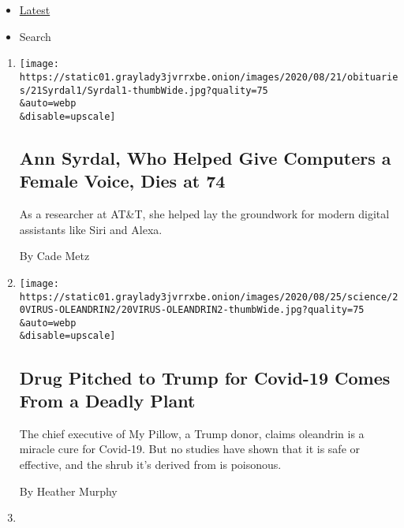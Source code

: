 \begin{itemize}
\tightlist
\item
  \protect\hyperlink{stream-panel}{Latest}
\item
  Search
\end{itemize}

\begin{enumerate}
\def\labelenumi{\arabic{enumi}.}
\item
  \href{/2020/08/20/technology/ann-syrdal-who-helped-give-computers-a-female-voice-dies-at-74.html}{}

  \texttt{[image: https://static01.graylady3jvrrxbe.onion/images/2020/08/21/obituaries/21Syrdal1/Syrdal1-thumbWide.jpg?quality=75\\\&auto=webp\\\&disable=upscale]}

  \hypertarget{ann-syrdal-who-helped-give-computers-a-female-voice-dies-at-74}{%
  \subsection{Ann Syrdal, Who Helped Give Computers a Female Voice, Dies
  at
  74}\label{ann-syrdal-who-helped-give-computers-a-female-voice-dies-at-74}}

  As a researcher at AT\&T, she helped lay the groundwork for modern
  digital assistants like Siri and Alexa.

  By Cade Metz
\item
  \href{/2020/08/20/health/covid-oleandrin-trump-mypillow.html}{}

  \texttt{[image: https://static01.graylady3jvrrxbe.onion/images/2020/08/25/science/20VIRUS-OLEANDRIN2/20VIRUS-OLEANDRIN2-thumbWide.jpg?quality=75\\\&auto=webp\\\&disable=upscale]}

  \hypertarget{drug-pitched-to-trump-for-covid-19-comes-from-a-deadly-plant}{%
  \subsection{Drug Pitched to Trump for Covid-19 Comes From a Deadly
  Plant}\label{drug-pitched-to-trump-for-covid-19-comes-from-a-deadly-plant}}

  The chief executive of My Pillow, a Trump donor, claims oleandrin is a
  miracle cure for Covid-19. But no studies have shown that it is safe
  or effective, and the shrub it's derived from is poisonous.

  By Heather Murphy
\item
  \href{/2020/08/20/health/Covid-us-mail-prescription-drugs.html}{}


\end{enumerate}
